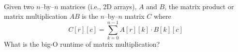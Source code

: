 Given two $n$--by--$n$ matrices (i.e., 2D arrays), $A$ and $B$,
the matrix product or matrix multiplication
$AB$ is the $n$--by--$n$ matrix $C$
where
\[
C[r][c] = \sum_{k=0}^{n-1} A[r][k] \cdot B[k][c]
\]
What is the big-O runtime of matrix multiplication?
